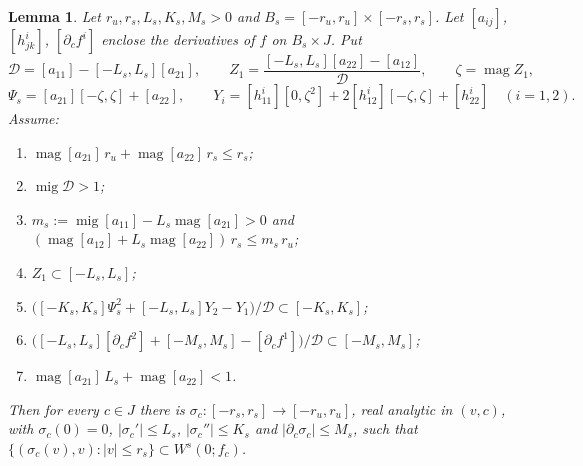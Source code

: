 \documentclass[11pt]{amsart}
\newtheorem{lemma}[thm]{Lemma}
\theoremstyle{definition}
\theoremstyle{remark}
\newcommand{\magn}{\operatorname{mag}}
\newcommand{\mig}{\operatorname{mig}}
\newcommand{\ival}[1]{[#1]}
\newcommand{\Ws}{W^s}
\newcommand{\Dh}{\mathcal{D}}
\begin{document}
\begin{lemma}\label{lem:Ws}
Let $r_u,r_s,L_s,K_s,M_s>0$ and $B_s=[-r_u,r_u]\times[-r_s,r_s]$. Let $\ival{a_{ij}}$, $\ival{h^i_{jk}}$,
$\ival{\partial_cf^i}$ enclose the derivatives of $f$ on $B_s\times J$. Put
\[
\Dh=\ival{a_{11}}-[-L_s,L_s]\ival{a_{21}},\qquad
Z_1=\frac{[-L_s,L_s]\ival{a_{22}}-\ival{a_{12}}}{\Dh},\qquad \zeta=\magn Z_1,
\]
\[
\Psi_s=\ival{a_{21}}[-\zeta,\zeta]+\ival{a_{22}},\qquad
Y_i=\ival{h^i_{11}}[0,\zeta^2]+2\ival{h^i_{12}}[-\zeta,\zeta]+\ival{h^i_{22}}\quad(i=1,2).
\]
Assume:
\begin{enumerate}[label=\textup{(S\arabic*)},leftmargin=*]
\item\label{S1} $\magn\ival{a_{21}}\,r_u+\magn\ival{a_{22}}\,r_s\le r_s$;
\item\label{S2} $\mig\Dh>1$;
\item\label{S3} $m_s:=\mig\ival{a_{11}}-L_s\magn\ival{a_{21}}>0$ and
$(\magn\ival{a_{12}}+L_s\magn\ival{a_{22}})\,r_s\le m_s\,r_u$;
\item\label{S4} $Z_1\subset[-L_s,L_s]$;
\item\label{S5} $\bigl([-K_s,K_s]\Psi_s^2+[-L_s,L_s]Y_2-Y_1\bigr)/\Dh\subset[-K_s,K_s]$;
\item\label{S6} $\bigl([-L_s,L_s]\ival{\partial_cf^2}+[-M_s,M_s]-\ival{\partial_cf^1}\bigr)/\Dh\subset[-M_s,M_s]$;
\item\label{S7} $\magn\ival{a_{21}}\,L_s+\magn\ival{a_{22}}<1$.
\end{enumerate}
Then for every $c\in J$ there is $\sigma_c\colon[-r_s,r_s]\to[-r_u,r_u]$, real analytic in $(v,c)$, with
$\sigma_c(0)=0$, $|\sigma_c'|\le L_s$, $|\sigma_c''|\le K_s$ and $|\partial_c\sigma_c|\le M_s$, such that
$\{(\sigma_c(v),v):|v|\le r_s\}\subset\Ws(0;f_c)$.
\end{lemma}
\end{document}
